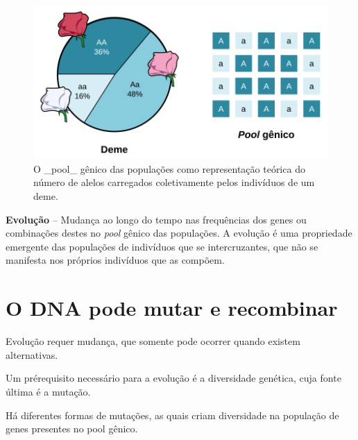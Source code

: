 \documentclass[
]{book}
\begin{document}
\begin{figure}

{\centering \includegraphics[width=600px]{figs/deme_pool_gene} 

}

\caption{O _pool_ gênico das populações como representação teórica do número de alelos carregados coletivamente pelos indivíduos  de um deme.}\label{fig:demepool}
\end{figure}

\textbf{Evolução} -- Mudança ao longo do tempo nas frequências dos genes ou combinações destes no \emph{pool} gênico das populações. A evolução é uma propriedade emergente das populações de indivíduos que se intercruzantes, que não se manifesta nos próprios indivíduos que as compõem.

\hypertarget{o-dna-pode-mutar-e-recombinar}{%
\section{O DNA pode mutar e recombinar}\label{o-dna-pode-mutar-e-recombinar}}

Evolução requer mudança, que somente pode ocorrer quando existem alternativas.

Um prérequisito necessário para a evolução é a diversidade genética, cuja fonte última é a mutação.

Há diferentes formas de mutações, as quais criam diversidade na população de genes presentes no pool gênico.
\end{document}
